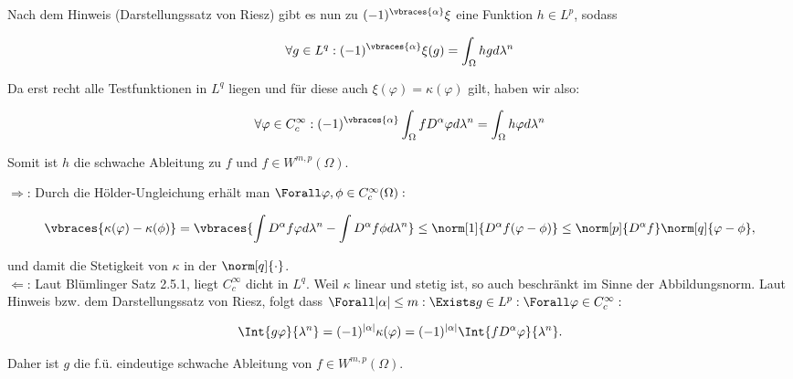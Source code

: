 \begin{solution}
Nach dem Hinweis (Darstellungssatz von Riesz) gibt es nun zu
$(-1)^{\vbraces{\alpha}}\xi$ eine Funktion $h \in L^p$, sodass

\begin{equation*}
  \forall g \in L^q: (-1)^{\vbraces{\alpha}}\xi(g)=\int_{\Omega}hgd\lambda^n
\end{equation*}

Da erst recht alle Testfunktionen in $L^q$ liegen und für diese auch
$\xi(\varphi) = \kappa(\varphi)$ gilt, haben wir also:

\begin{equation*}
  \forall \varphi\in C^{\infty}_c:(-1)^{\vbraces{\alpha}}\int_{\Omega}
  fD^{\alpha}\varphi d\lambda^n = \int_{\Omega}h\varphi d\lambda^n
\end{equation*}

Somit ist $h$ die schwache Ableitung zu $f$ und $f\in W^{m,p}(\Omega)$.

\end{solution}

\begin{solution}

$\Rightarrow$: Durch die Hölder-Ungleichung erhält man $\Forall \varphi, \phi \in C_c^\infty(\Omega):$

\begin{equation*}
  \vbraces{\kappa(\varphi) - \kappa(\phi)} =
  \vbraces
  {
    \int D^\alpha f \varphi d \lambda^n -
    \int D^\alpha f \phi d \lambda^n
  } \leq
  \norm[1]{D^\alpha f (\varphi - \phi)} \leq
  \norm[p]{D^\alpha f}
  \norm[q]{\varphi - \phi},
\end{equation*}

und damit die Stetigkeit von $\kappa$ in der $\norm[q]{\cdot}$. \\

$\Leftarrow$: Laut Blümlinger Satz 2.5.1, liegt $C_c^\infty$ dicht in $L^q$. Weil $\kappa$ linear und stetig ist, so auch beschränkt im Sinne der Abbildungsnorm. Laut Hinweis bzw. dem Darstellungssatz von Riesz, folgt dass $\Forall |\alpha| \leq m: \Exists g \in L^p: \Forall \varphi \in C_c^\infty:$

\begin{align*}
  \Int{g \varphi}{\lambda^n} =
  (-1)^{|\alpha|} \kappa(\varphi) =
  (-1)^{|\alpha|} \Int{f D^\alpha \varphi}{\lambda^n}.
\end{align*}

Daher ist $g$ die f.ü. eindeutige schwache Ableitung von $f \in W^{m, p}(\Omega)$.

\end{solution}
